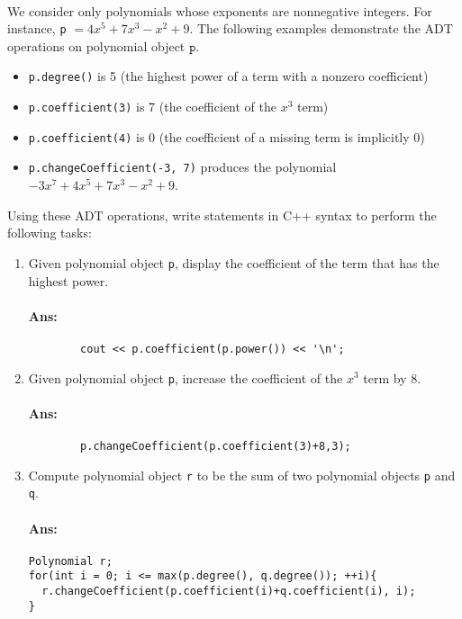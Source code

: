 \documentclass{article}
\begin{document}
        \paragraph{}We consider only polynomials whose exponents are nonnegative integers. For instance, 
        \texttt{p} $= 4x^5 + 7x^3 - x^2 + 9$.
        The following examples demonstrate the ADT operations on polynomial object $\texttt{p}$.
\begin{itemize}
    \item \texttt{p.degree()} is 5 (the highest power of a term with a nonzero coefficient)
    \item \texttt{p.coefficient(3)} is 7 (the coefficient of the $x^3$ term)
    \item \texttt{p.coefficient(4)} is 0 (the coefficient of a missing term is implicitly 0)
    \item \texttt{p.changeCoefficient(-3, 7)} produces the polynomial $-3x^7 + 4x^5 + 7x^3 - x^2 + 9$.
    \end{itemize}
Using these ADT operations, write statements in C++ syntax to perform the following tasks:
\begin{enumerate}[label=(\alph*).]
    \item Given polynomial object \texttt{p}, display the coefficient of the term that has the highest power.
        \paragraph{Ans:}\begin{verbatim}
        cout << p.coefficient(p.power()) << '\n';
        \end{verbatim}
    \item Given polynomial object \texttt{p}, increase the coefficient of the $x^3$ term by 8.
        \paragraph{Ans:}\begin{verbatim}
        p.changeCoefficient(p.coefficient(3)+8,3);
        \end{verbatim}
    \item Compute polynomial object \texttt{r} to be the sum of two polynomial objects \texttt{p} and \texttt{q}.
    \paragraph{Ans:}\begin{verbatim}
Polynomial r;
for(int i = 0; i <= max(p.degree(), q.degree()); ++i){
  r.changeCoefficient(p.coefficient(i)+q.coefficient(i), i);
}
    \end{verbatim}

    \end{enumerate}
    
\end{document}
